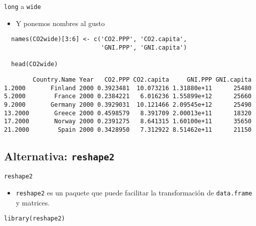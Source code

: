\documentclass[xcolor={usenames,svgnames,dvipsnames}]{beamer}
\begin{document}
\begin{frame}[fragile,label=sec-3-2-5]{\texttt{long} a \texttt{wide}}
 \begin{itemize}
\item Y ponemos nombres al gusto
\end{itemize}
\lstset{language=R,label= ,caption= ,numbers=none}
\begin{lstlisting}
  names(CO2wide)[3:6] <- c('CO2.PPP', 'CO2.capita',
                           'GNI.PPP', 'GNI.capita')
  
  head(CO2wide)
\end{lstlisting}

\begin{verbatim}
        Country.Name Year   CO2.PPP CO2.capita     GNI.PPP GNI.capita
1.2000       Finland 2000 0.3923481  10.073216 1.31880e+11      25480
5.2000        France 2000 0.2384221   6.016236 1.55899e+12      25660
9.2000       Germany 2000 0.3929031  10.121466 2.09545e+12      25490
13.2000       Greece 2000 0.4598579   8.391709 2.00013e+11      18320
17.2000       Norway 2000 0.2391275   8.641315 1.60100e+11      35650
21.2000        Spain 2000 0.3428950   7.312922 8.51462e+11      21150
\end{verbatim}
\end{frame}

\subsection{Alternativa: \texttt{reshape2}}
\label{sec-3-3}

\begin{frame}[fragile,label=sec-3-3-1]{\texttt{reshape2}}
 \begin{itemize}
\item \texttt{reshape2} es un paquete que puede facilitar la transformación de \texttt{data.frame} y matrices.
\end{itemize}
\lstset{language=R,label= ,caption= ,numbers=none}
\begin{lstlisting}
library(reshape2)
\end{lstlisting}
\end{frame}
\end{document}
